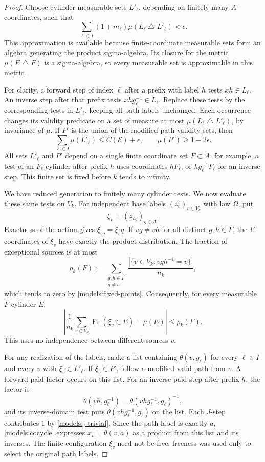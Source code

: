 \begin{proof}
Choose cylinder-measurable sets $L'_\ell$, depending on finitely many
$A$-coordinates, such that
\[
 \sum_{\ell\in I}(1+m_\ell)
       \mu(L_\ell\mathbin{\triangle}L'_\ell)<\epsilon.
\]
This approximation is available because finite-coordinate measurable
sets form an algebra generating the product sigma-algebra. Its closure
for the metric $\mu(E\mathbin{\triangle}F)$ is a sigma-algebra, so
every measurable set is approximable in this metric.

For clarity, a forward step of index $\ell$ after a prefix with label
$h$ tests $xh\in L_\ell$. An inverse step after that prefix tests
$xhg_\ell^{-1}\in L_\ell$. Replace these tests by the corresponding
tests in $L'_\ell$, keeping all path labels unchanged. Each occurrence
changes its validity predicate on a set of measure at most
$\mu(L_\ell\mathbin{\triangle}L'_\ell)$, by invariance of $\mu$.
If $P'$ is the union of the modified path validity sets, then
\begin{equation}
 \sum_{\ell\in I}\mu(L'_\ell)\le C(\mathcal E)+\epsilon,
 \qquad \mu(P')\ge1-2\epsilon.
 \label{models:cylinder-bounds}
\end{equation}
All sets $L'_\ell$ and $P'$ depend on a single finite coordinate set
$F\subset A$: for example, a test of an $F_\ell$-cylinder after prefix
$h$ uses coordinates $hF_\ell$, or $hg_\ell^{-1}F_\ell$ for an inverse
step. This finite set is fixed before $k$ tends to infinity.

We have reduced generation to finitely many cylinder tests. We now
evaluate these same tests on $V_k$.
For independent base labels $(z_v)_{v\in V_k}$ with law $\Omega$, put
\[
 \xi_v=(z_{vg})_{g\in A}.
\]
Exactness of the action gives $\xi_{vq}=\xi_vq$. If $vg\ne vh$ for
all distinct $g,h\in F$, the $F$-coordinates of $\xi_v$ have exactly
the product distribution. The fraction of exceptional sources is at
most
\[
 \rho_k(F):=
 \sum_{\substack{g,h\in F\\g\ne h}}
 \frac{|\{v\in V_k:vgh^{-1}=v\}|}{n_k},
\]
which tends to zero by \eqref{models:fixed-points}. Consequently, for
every measurable $F$-cylinder $E$,
\begin{equation}
 \left|\frac1{n_k}\sum_{v\in V_k}
       \Pr(\xi_v\in E)-\mu(E)\right|\le\rho_k(F).
 \label{models:local-law}
\end{equation}
This uses no independence between different sources $v$.

For any realization of the labels, make a list containing
$\theta(v,g_\ell)$ for every $\ell\in I$ and every $v$ with
$\xi_v\in L'_\ell$. If $\xi_v\in P'$, follow a modified valid path
from $v$. A forward paid factor occurs on this list. For an inverse
paid step after prefix $h$, the factor is
\[
 \theta(vh,g_\ell^{-1})
   =\theta(vhg_\ell^{-1},g_\ell)^{-1},
\]
and its inverse-domain test puts
$\theta(vhg_\ell^{-1},g_\ell)$ on the list.
Each $J$-step contributes $1$ by \eqref{models:j-trivial}. Since the
path label is exactly $a$, \eqref{models:cocycle} expresses
$x_v=\theta(v,a)$ as a product from this list and its inverses.
The finite configuration $\xi_v$ need not be free; freeness was used
only to select the original path labels.


\end{proof}
